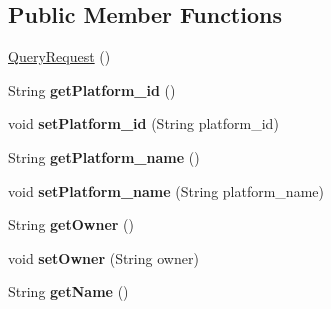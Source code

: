 \subsection*{Public Member Functions}
\begin{DoxyCompactItemize}
\item 
\hyperlink{classeu_1_1h2020_1_1symbiote_1_1model_1_1QueryRequest_aa75c10982a4ad24eb83169b6c9e12e1d}{Query\+Request} ()
\item 
String {\bfseries get\+Platform\+\_\+id} ()\hypertarget{classeu_1_1h2020_1_1symbiote_1_1model_1_1QueryRequest_a694e12ebd593f9c3d5d0886d90e5e566}{}\label{classeu_1_1h2020_1_1symbiote_1_1model_1_1QueryRequest_a694e12ebd593f9c3d5d0886d90e5e566}

\item 
void {\bfseries set\+Platform\+\_\+id} (String platform\+\_\+id)\hypertarget{classeu_1_1h2020_1_1symbiote_1_1model_1_1QueryRequest_a2f08afacf10ed0e39e1c0370c5501dcd}{}\label{classeu_1_1h2020_1_1symbiote_1_1model_1_1QueryRequest_a2f08afacf10ed0e39e1c0370c5501dcd}

\item 
String {\bfseries get\+Platform\+\_\+name} ()\hypertarget{classeu_1_1h2020_1_1symbiote_1_1model_1_1QueryRequest_a852341234f18a585092a88a7d65fa26c}{}\label{classeu_1_1h2020_1_1symbiote_1_1model_1_1QueryRequest_a852341234f18a585092a88a7d65fa26c}

\item 
void {\bfseries set\+Platform\+\_\+name} (String platform\+\_\+name)\hypertarget{classeu_1_1h2020_1_1symbiote_1_1model_1_1QueryRequest_a91062336381c5407ccf538dd42a3d0ad}{}\label{classeu_1_1h2020_1_1symbiote_1_1model_1_1QueryRequest_a91062336381c5407ccf538dd42a3d0ad}

\item 
String {\bfseries get\+Owner} ()\hypertarget{classeu_1_1h2020_1_1symbiote_1_1model_1_1QueryRequest_ab8242add5f60d72f543b2c3ef810a222}{}\label{classeu_1_1h2020_1_1symbiote_1_1model_1_1QueryRequest_ab8242add5f60d72f543b2c3ef810a222}

\item 
void {\bfseries set\+Owner} (String owner)\hypertarget{classeu_1_1h2020_1_1symbiote_1_1model_1_1QueryRequest_a921224a5bb7f0f83acc5928626eb1f92}{}\label{classeu_1_1h2020_1_1symbiote_1_1model_1_1QueryRequest_a921224a5bb7f0f83acc5928626eb1f92}

\item 
String {\bfseries get\+Name} ()\hypertarget{classeu_1_1h2020_1_1symbiote_1_1model_1_1QueryRequest_ab936ac526089c32ed4ac4d1301f861b4}{}\label{classeu_1_1h2020_1_1symbiote_1_1model_1_1QueryRequest_ab936ac526089c32ed4ac4d1301f861b4}


\end{DoxyCompactItemize}
